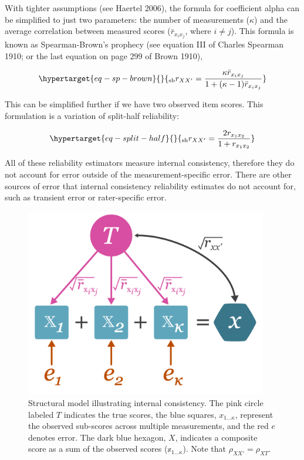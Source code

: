 \documentclass[
  letterpaper,
  DIV=11,
  numbers=noendperiod]{scrreprt}
\begin{document}
With tighter assumptions (see Haertel 2006), the formula for coefficient
alpha can be simplified to just two parameters: the number of
measurements (\(\kappa\)) and the average correlation between measured
scores (\(\bar{r}_{x_i x_j}\), where \(i\neq j\)). This formula is known
as Spearman-Brown's prophecy (see equation III of Charles Spearman 1910;
or the last equation on page 299 of Brown 1910),

\begin{equation}\protect\hypertarget{eq-sp-brown}{}{
_\text{sb} r_{XX'}= \frac{\kappa \bar{r}_{x_i x_j}}{1+(\kappa-1)\bar{r}_{x_i x_j}}
}\label{eq-sp-brown}\end{equation}

This can be simplified further if we have two observed item scores. This
formulation is a variation of split-half reliability:

\begin{equation}\protect\hypertarget{eq-split-half}{}{
_\text{sh}r_{XX'}= \frac{2r_{x_1 x_2}}{1+r_{x_1 x_2}}
}\label{eq-split-half}\end{equation}

All of these reliability estimators measure internal consistency,
therefore they do not account for error outside of the
measurement-specific error. There are other sources of error that
internal consistency reliability estimates do not account for, such as
transient error or rater-specific error.

\begin{figure}[H]

{\centering \includegraphics[width=4.16667in,height=\textheight]{figure/unreliability_diagram_2.png}

}

\caption{Structural model illustrating internal consistency. The pink
circle labeled \(T\) indicates the true scores, the blue squares,
\(x_{1...\kappa}\), represent the observed sub-scores across multiple
measurements, and the red \(e\) denotes error. The dark blue hexagon,
\(X\), indicates a composite score as a sum of the observed scores
(\(\mathbb{x}_{1...\kappa}\)). Note that \(\rho_{XX'}=\rho_{XT}\).}

\end{figure}
\end{document}
